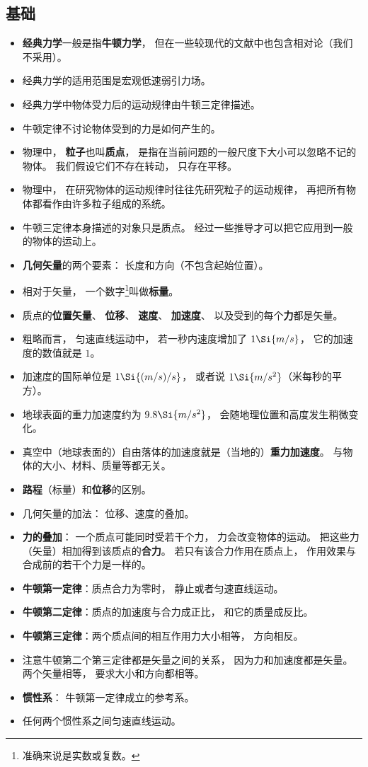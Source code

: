 
\begin{issues}
\issueDraft
\end{issues}

\subsection{基础}
\begin{itemize}
\item \textbf{经典力学}一般是指\textbf{牛顿力学}， 但在一些较现代的文献中也包含相对论（我们不采用）。
\item 经典力学的适用范围是宏观低速弱引力场。
\item 经典力学中物体受力后的运动规律由牛顿三定律描述。
\item 牛顿定律不讨论物体受到的力是如何产生的。
\item 物理中， \textbf{粒子}也叫\textbf{质点}， 是指在当前问题的一般尺度下大小可以忽略不记的物体。 我们假设它们不存在转动， 只存在平移。
\item 物理中， 在研究物体的运动规律时往往先研究粒子的运动规律， 再把所有物体都看作由许多粒子组成的系统。
\item 牛顿三定律本身描述的对象只是质点。 经过一些推导才可以把它应用到一般的物体的运动上。
\item \textbf{几何矢量}的两个要素： 长度和方向（不包含起始位置）。
\item 相对于矢量， 一个数字\footnote{准确来说是实数或复数。}叫做\textbf{标量}。
\item 质点的\textbf{位置矢量}、 \textbf{位移}、 \textbf{速度}、 \textbf{加速度}、 以及受到的每个\textbf{力}都是矢量。
\item 粗略而言， 匀速直线运动中， 若一秒内速度增加了 $1\Si{m/s}$， 它的加速度的数值就是 $1$。
\item 加速度的国际单位是 $1\Si{(m/s)/s}$， 或者说 $1\Si{m/s^2}$（米每秒的平方）。
\item 地球表面的重力加速度约为 $9.8\Si{m/s^2}$， 会随地理位置和高度发生稍微变化。
\item 真空中（地球表面的）自由落体的加速度就是（当地的）\textbf{重力加速度}。 与物体的大小、材料、质量等都无关。
\item \textbf{路程}（标量）和\textbf{位移}的区别。
\item 几何矢量的加法： 位移、速度的叠加。
\item \textbf{力的叠加}： 一个质点可能同时受若干个力， 力会改变物体的运动。 把这些力（矢量）相加得到该质点的\textbf{合力}。 若只有该合力作用在质点上， 作用效果与合成前的若干个力是一样的。
\item \textbf{牛顿第一定律}：质点合力为零时， 静止或者匀速直线运动。
\item \textbf{牛顿第二定律}：质点的加速度与合力成正比， 和它的质量成反比。
\item \textbf{牛顿第三定律}：两个质点间的相互作用力大小相等， 方向相反。
\item 注意牛顿第二个第三定律都是矢量之间的关系， 因为力和加速度都是矢量。 两个矢量相等， 要求大小和方向都相等。
\item \textbf{惯性系}： 牛顿第一定律成立的参考系。
\item 任何两个惯性系之间匀速直线运动。
\end{itemize}

